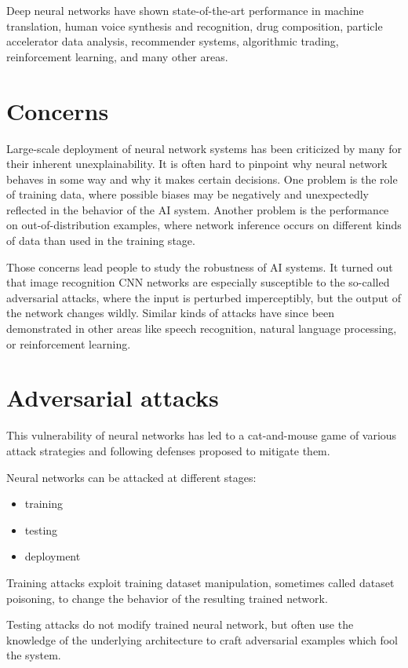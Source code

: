 Deep neural networks have shown state-of-the-art performance in machine translation, human voice synthesis and recognition, drug composition, particle accelerator data analysis, recommender systems, algorithmic trading, reinforcement learning, and many other areas.

\section{Concerns}
Large-scale deployment of neural network systems has been criticized by many for their inherent unexplainability. It is often hard to pinpoint why neural network behaves in some way and why it makes certain decisions. One problem is the role of training data, where possible biases may be negatively and unexpectedly reflected in the behavior of the AI system. Another problem is the performance on out-of-distribution examples, where network inference occurs on different kinds of data than used in the training stage.

Those concerns lead people to study the robustness of AI systems. It turned out that image recognition CNN networks are especially susceptible to the so-called adversarial attacks, where the input is perturbed imperceptibly, but the output of the network changes wildly. Similar kinds of attacks have since been demonstrated in other areas like speech recognition, natural language processing, or reinforcement learning.

\section{Adversarial attacks}
This vulnerability of neural networks has led to a cat-and-mouse game of various attack strategies and following defenses proposed to mitigate them.

Neural networks can be attacked at different stages:
\begin{itemize}
    \item training
    \item testing
    \item deployment
\end{itemize}

Training attacks exploit training dataset manipulation, sometimes called dataset poisoning, to change the behavior of the resulting trained network.

Testing attacks do not modify trained neural network, but often use the knowledge of the underlying architecture to craft adversarial examples which fool the system. 

